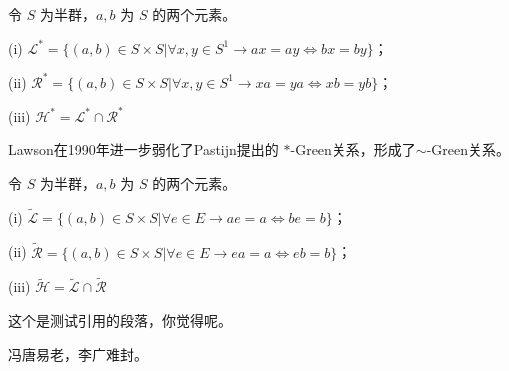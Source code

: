 \begin{definition}
    令 $S$ 为半群，$a, b$ 为 $S$ 的两个元素。

    (i) $\mathcal{L}^{\ast} = \{(a,b)\in S\times S| \forall x,y \in S^1 \rightarrow ax=ay \Leftrightarrow bx=by\}$；

    (ii) $\mathcal{R}^{\ast} = \{(a,b)\in S\times S| \forall x,y \in S^1 \rightarrow xa=ya \Leftrightarrow xb=yb\}$；

    (iii) $\mathcal{H}^{\ast} = \mathcal{L}^{\ast} \cap \mathcal{R}^{\ast}$
\end{definition}

Lawson在1990年进一步弱化了Pastijn提出的 $\ast$-Green关系，形成了$\sim$-Green关系。

\begin{definition}
    令 $S$ 为半群，$a, b$ 为 $S$ 的两个元素。

    (i) $\tilde{\mathcal{L}} = \{(a,b)\in S\times S| \forall e \in E \rightarrow ae=a \Leftrightarrow be=b\}$；

    (ii) $\tilde{\mathcal{R}} = \{(a,b)\in S\times S| \forall e \in E \rightarrow ea=a \Leftrightarrow eb=b\}$；

    (iii) $\tilde{\mathcal{H}} = \tilde{\mathcal{L}} \cap \tilde{\mathcal{R}}$
\end{definition}



这个是测试引用的段落\cite{Ibrahim2022}，你觉得呢\cite[定理 8]{SB2077}。

冯唐易老，李广难封\supercite{SB2077}。


